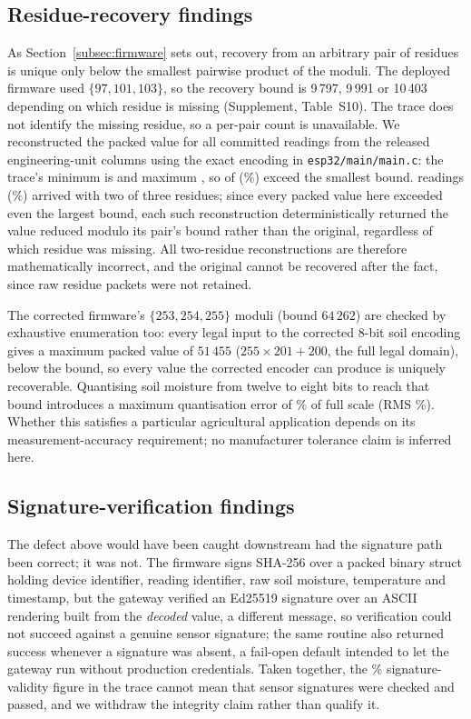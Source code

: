 \documentclass[a4paper,fleqn]{cas-sc}
\begin{document}
\subsection{Residue-recovery findings}
\label{subsec:pm_crt}

As Section~\ref{subsec:firmware} sets out, recovery from an arbitrary pair
of residues is unique only below the smallest pairwise product of the
moduli. The deployed firmware used $\{97, 101, 103\}$, so the recovery
bound is 9\,797, 9\,991 or 10\,403 depending on which residue is missing
(Supplement, Table~S10). The trace does not identify the missing residue,
so a per-pair count is unavailable. We reconstructed the packed
value for all \CRTExceedN{} committed readings from the released
engineering-unit columns using the exact encoding in
\texttt{esp32/main/main.c}: the trace's minimum is \CRTPackedMin{} and
maximum \CRTPackedMax{}, so \CRTExceedCount{} of \CRTExceedN{}
(\CRTExceedPct\%) exceed the smallest bound. \CRTRecovered{} readings
(\CRTLossRatePct\%) arrived with two of three residues; since every
packed value here exceeded even the largest bound, each such
reconstruction deterministically returned the value reduced modulo its
pair's bound rather than the original, regardless of which residue was
missing. All \CRTRecovered{} two-residue reconstructions are therefore
mathematically incorrect, and the original cannot be recovered after the
fact, since raw residue packets were not retained.

The corrected firmware's $\{253, 254, 255\}$ moduli (bound $64\,262$) are
checked by exhaustive enumeration too: every legal input to the corrected
8-bit soil encoding gives a maximum packed value of $51\,455$
($255 \times 201 + 200$, the full legal domain), below the bound, so
every value the corrected encoder can produce is uniquely recoverable.
Quantising soil moisture from twelve to eight bits to reach that bound
introduces a maximum quantisation error of \QuantErrMaxPct\% of full
scale (RMS \QuantErrRMSPct\%). Whether this satisfies a particular
agricultural application depends on its measurement-accuracy requirement;
no manufacturer tolerance claim is inferred here.

\subsection{Signature-verification findings}
\label{subsec:pm_signature}

The defect above would have been caught downstream had the signature path
been correct; it was not. The firmware signs SHA-256 over a packed binary
struct holding device identifier, reading identifier, raw soil moisture,
temperature and timestamp, but the gateway verified an Ed25519 signature
over an ASCII rendering built from the \emph{decoded} value, a different
message, so verification could not succeed against a genuine sensor
signature; the same routine also returned success whenever a signature
was absent, a fail-open default intended to let the gateway run without
production credentials. Taken together, the \SigValidPct\%
signature-validity figure in the trace cannot mean that sensor signatures
were checked and passed, and we withdraw the integrity claim rather than
qualify it.
\end{document}
